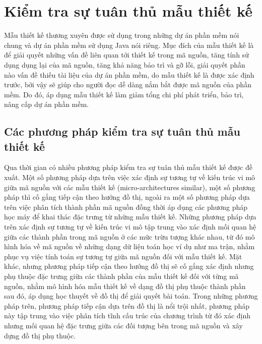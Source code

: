 \documentclass[12pt]{report}
\begin{document}
\section{Kiểm tra sự tuân thủ mẫu thiết kế}
Mẫu thiết kế thương xuyên được sử dụng trong những dự án phần mềm nói chung và dự án phần mềm sử dụng Java nói riêng. Mục đích của mẫu thiết kế là để giải quyết những vấn đề liên quan tới thiết kế trong mã nguồn, tăng tính sử dụng dụng lại của mã nguồn, tăng khả năng bảo trì và gỡ lỗi, giải quyết phần nào vấn đề thiếu tài liệu của dự án phần mềm, do mẫu thiết kế là được xác định trước, bởi vậy sẽ giúp cho người đọc dễ dàng nắm bắt được mã nguồn của phần mềm. Do đó, áp dụng mẫu thiết kế làm giảm tổng chi phí phát triển, bảo trì, nâng cấp dự án phần mềm.
\subsection{Các phương pháp kiểm tra sự tuân thủ mẫu thiết kế}
Qua thời gian có nhiều phương pháp kiểm tra sự tuân thủ mẫu thiết kế được đề xuất. Một số phương pháp dựa trên việc xác định sự tương tự về kiến trúc vi mô giữa mã nguồn với các mẫu thiết kế (micro-architectures similar), một số phương pháp thì cố gắng tiếp cận theo hướng đồ thị, ngoài ra một số phương pháp dựa trên việc phân tích thành phần mã nguồn đồng thời áp dụng các phương pháp học máy để khai thác đặc trưng từ những mẫu thiết kế. Những phương pháp dựa trên xác định sự tương tự về kiến trúc vi mô tập trung vào xác định mối quan hệ giữa các thành phần trong mã nguồn ở các mức trừu tượng khác nhau, từ đó mô hình hóa về mã nguồn về những dạng dữ liệu toán học ví dụ như ma trận, nhằm phục vụ việc tính toán sự tương tự giữa mã nguồn đối với mẫu thiết kế.
Mặt khác, nhưng phương pháp tiếp cận theo hướng đồ thị sẽ cố gắng xác định nhưng phụ thuộc đặc trưng giữa các thành phần của mẫu thiết kế đối với từng mã nguồn, nhằm mô hình hóa mẫu thiết kế về dạng đồ thị phụ thuộc thành phần sau đó, áp dụng học thuyết về đồ thị để giải quyết bài toán. Trong những phương pháp trên, phương pháp tiếp cận dựa trên đồ thị là nổi trội nhất, phương pháp này tập trung vào việc phân tích tĩnh cấu trúc của chương trình từ đó xác định nhưng mối quan hệ đặc trưng giữa các đối tượng bên trong mã nguồn và xây dựng đồ thị phụ thuộc.
\end{document}
